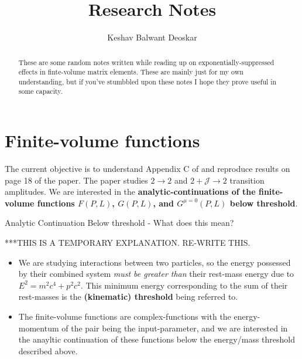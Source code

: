 \documentclass{article}
\title{Research Notes}
\author{Keshav Balwant Deoskar}
\begin{document}
\maketitle

\begin{abstract}
These are some random notes written while reading up on exponentially-suppressed effects in finte-volume matrix elements. These are mainly just for my own understanding, but if you've stumbbled upon these notes I hope they prove useful in some capacity.
\end{abstract}


\tableofcontents

\pagebreak

\section{Finite-volume functions}

The current objective is to understand Appendix C of \cite{Briceño} and reproduce results on page 18 of the paper. The paper studies $2 \rightarrow 2$ and $2 + \mathcal{J} \rightarrow 2$ transition amplitudes. We are interested in the \textbf{analytic-continuations of the finite-volume functions $F(P, L)$, $G(P, L)$, and $G^{\mu = 0}(P, L)$ below threshold}.

\begin{mathdefinitionbox}{Analytic Continuation Below threshold - What does this mean?}

  ***THIS IS A TEMPORARY EXPLANATION. RE-WRITE THIS.
  \vskip 0.5cm
  
  \begin{itemize}
    \item We are studying interactions between two particles, so the energy possessed by their combined system \emph{must be greater than} their rest-mass energy due to $E^2 = m^2c^4 + p^2c^2$. This minimum energy corresponding to the sum of their rest-masses is the \textbf{(kinematic) threshold} being referred to. 
    
    \vskip 0.5cm
    \item The finite-volume functions are complex-functions with the energy-momentum of the pair being the input-parameter, and we are interested in the anayltic continuation of these functions below the energy/mass threshold described above.
  \end{itemize}
\end{mathdefinitionbox}
\end{document}
